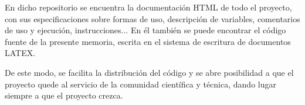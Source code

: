 En dicho repositorio se encuentra la documentación HTML de todo el proyecto, con sus especificaciones sobre formas de uso, descripción de variables, comentarios de uso y ejecución, instrucciones... En él también se puede encontrar el código fuente de la presente memoria, escrita en el sistema de escritura de documentos LATEX.

De este modo, se facilita la distribución del código y se abre posibilidad a que el proyecto quede al servicio de la comunidad científica y técnica, dando lugar siempre a que el proyecto crezca.
